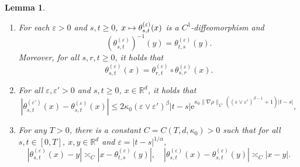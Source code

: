 \documentclass[11pt]{article}
\newcommand{\skpt}{\smallskip}
\numberwithin{equation}{section}\providecommand{\asymp}{\mathrel{\sim}}
\def\mto{\mathchoice{\longmapsto}{\mapsto}{\mapsto}{\mapsto}}
\theoremstyle{plain}
\newtheorem{lemma}[theorem]{Lemma}
\theoremstyle{definition}
\newcommand\e{\mathrm{e}}
\let\eps\varepsilon
\newcommand\mR{\mathbb{R}}
\newcommand\1{{\mathbf{1}}}
\begin{document}
\skpt
\begin{lemma}\label{Le41}
\begin{enumerate}
\item For each $\eps>0$ and $s,t\geq 0$, $x\mto \theta^{(\eps)}_{s,t}(x)$ is a $C^1$-diffeomorphism and
\begin{equation}\label{Inv}
(\theta^{(\eps)}_{s,t})^{-1}(y)=\theta^{(\eps)}_{t,s}(y).
\end{equation}
Moreover, for all $s,r,t\geq 0$, it holds that
\begin{equation}\label{flow}
\theta^{(\eps)}_{s,t}(x)=\theta^{(\eps)}_{r,t}\circ\theta^{(\eps)}_{s,r}(x).
\end{equation}

\item For all $\eps,\eps'>0$ and $s,t\geq 0$, $x\in\mR^d$, it holds that
\begin{equation}\label{AQ4}
|\theta^{(\eps')}_{s,t}(x)-\theta^{(\eps)}_{s,t}(x)|\leq 2\kappa_0(\eps\vee\eps')^\beta
|t-s|\e^{\kappa_0\|\nabla\rho\|_{L^1}((\eps\vee\eps')^{\beta-1}+1)|t-s|},
\end{equation}

\item For any $T>0$, there is a constant $C=C(T,d,\kappa_0)>0$ such that for all $s,t\in[0,T]$, $x,y\in\mR^d$ and $\eps=|t-s|^{1/\alpha}$,
\begin{equation}\label{AQ3}
|\theta^{(\eps)}_{s,t}(x)-y|\asymp_C|x-\theta^{(\eps)}_{t,s}(y)|,\quad |\theta^{(\eps)}_{s,t}(x)-\theta^{(\eps)}_{s,t}(y)|\asymp_C|x-y|.
\end{equation}
\end{enumerate}
\end{lemma}
\skpt
\end{document}
